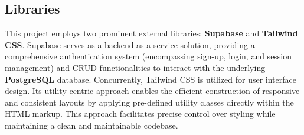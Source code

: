 \subsection{Libraries}

This project employs two prominent external libraries: \textbf{Supabase} and \textbf{Tailwind CSS}. Supabase serves as a
backend-as-a-service solution, providing a comprehensive authentication system (encompassing sign-up, login, and
session management) and CRUD functionalities to interact with the underlying \textbf{PostgreSQL} database.
Concurrently, Tailwind CSS is utilized for user interface design. Its utility-centric approach enables the
efficient construction of responsive and consistent layouts by applying pre-defined utility classes directly within
the HTML markup. This approach facilitates precise control over styling while maintaining a clean and maintainable
codebase.


